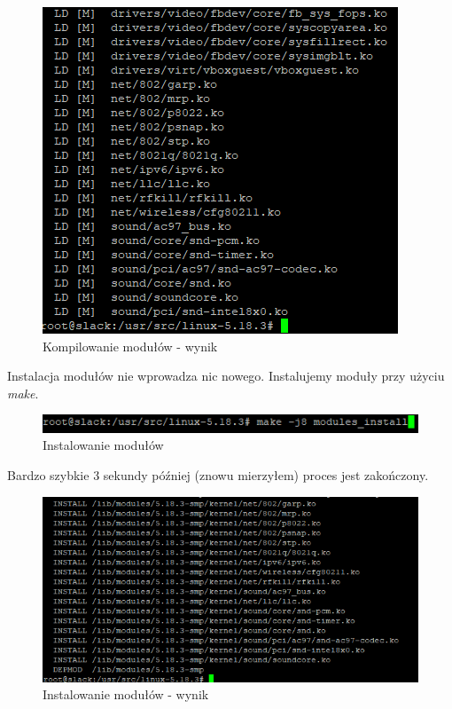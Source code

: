 \documentclass[a4paper,12pt,oneside]{book} %
\begin{document}
\begin{figure}[h]
	\centering
	\includegraphics[scale=0.6]{11-modules-comp}
	\caption{Kompilowanie modułów - wynik}
	\label{modules-comp}
\end{figure}

\pagebreak

Instalacja modułów nie wprowadza nic nowego. Instalujemy moduły przy użyciu \emph{make}.

\begin{figure}[h]
	\centering
	\includegraphics[scale=0.6]{12-modules-install}
	\caption{Instalowanie modułów}
	\label{modules-install}
\end{figure}

Bardzo szybkie 3 sekundy później (znowu mierzyłem) proces jest zakończony.

\begin{figure}[h]
	\centering
	\includegraphics[scale=0.6]{13-modules-install-res}
	\caption{Instalowanie modułów - wynik}
	\label{modules-install-res}
\end{figure}
\end{document}
